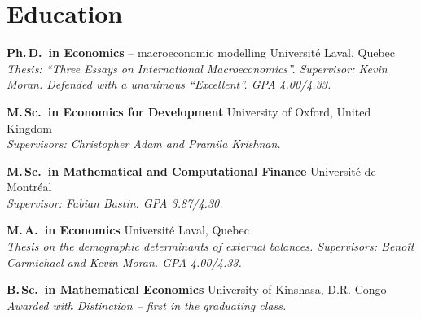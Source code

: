 \documentclass[11pt,letterpaper]{article}
\newenvironment{datelist}
  {\begin{description}[style=multiline,leftmargin=2.75cm,labelwidth=2.55cm,
     labelsep=0.2cm,font=\normalfont\small\color{soft},
     itemsep=0.45em,topsep=0.25em,parsep=0.15em]}
  {\end{description}}
\newcommand{\dotsep}{\;\textcolor{soft}{\textbullet}\;}
\newcommand{\meta}[1]{{\small\itshape\color{soft}#1}}
\begin{document}
\section{Education}
\begin{datelist}
  \item[2018--2025] \textbf{Ph.\,D.\ in Economics} -- macroeconomic modelling \dotsep Université Laval, Quebec\\
    \meta{Thesis: ``Three Essays on International Macroeconomics''. Supervisor: Kevin Moran. Defended with a unanimous ``Excellent''. GPA 4.00/4.33.}
  \item[2016--2017] \textbf{M.\,Sc.\ in Economics for Development} \dotsep University of Oxford, United Kingdom\\
    \meta{Supervisors: Christopher Adam and Pramila Krishnan.}
  \item[2022--present] \textbf{M.\,Sc.\ in Mathematical and Computational Finance} \dotsep Université de Montréal\\
    \meta{Supervisor: Fabian Bastin. GPA 3.87/4.30.}
  \item[2012--2014] \textbf{M.\,A.\ in Economics} \dotsep Université Laval, Quebec\\
    \meta{Thesis on the demographic determinants of external balances. Supervisors: Benoît Carmichael and Kevin Moran. GPA 4.00/4.33.}
  \item[2005--2010] \textbf{B.\,Sc.\ in Mathematical Economics} \dotsep University of Kinshasa, D.R. Congo\\
    \meta{Awarded with Distinction -- first in the graduating class.}
\end{datelist}
\end{document}
